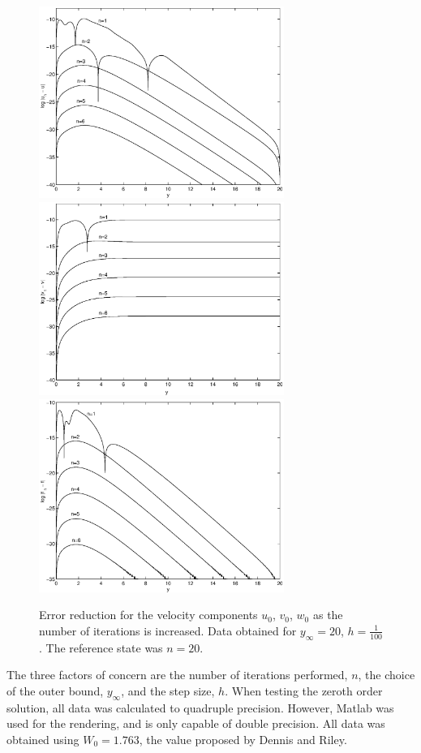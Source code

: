 \documentclass[10pt,a4paper]{report}
\begin{document}
\begin{figure}[ht]
\centering
\includegraphics[width=8cm]{pics/u0iter.eps}
\includegraphics[width=8cm]{pics/v0iter.eps}
\includegraphics[width=8cm]{pics/w0iter.eps}
\caption[Error reduction for $k=0$ as number of iterations is increased]{Error reduction for the velocity components $u_0$, $v_0$, $w_0$ as the number of iterations is increased. Data obtained for $y_\infty = 20$, $h = \frac{1}{100}$. The reference state was $n=20$.}
\label{iterate}
\end{figure}

The three factors of concern are the number of iterations performed, $n$, the choice of the outer bound, $y_\infty$, and the step size, $h$. When testing the zeroth order solution, all data was calculated to quadruple precision. However, Matlab was used for the rendering, and is only capable of double precision. All data was obtained using $W_0 = 1.763$, the value proposed by Dennis and Riley.
\end{document}
